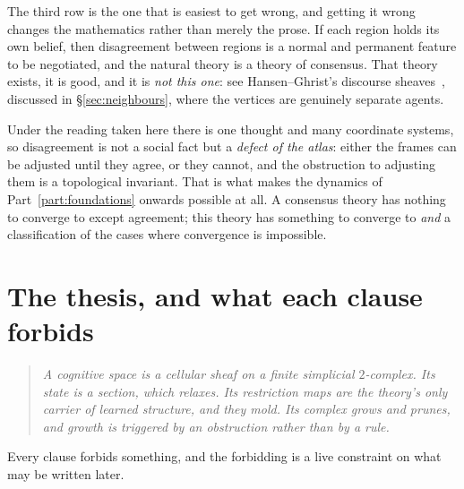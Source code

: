 \begin{hon}\Hon
The third row is the one that is easiest to get wrong, and getting it wrong
changes the mathematics rather than merely the prose. If each region holds its
own belief, then disagreement between regions is a normal and permanent
feature to be negotiated, and the natural theory is a theory of consensus.
That theory exists, it is good, and it is \emph{not this one}: see
Hansen--Ghrist's discourse sheaves~\cite{HansenGhristOpinion}, discussed in
\S\ref{sec:neighbours}, where the vertices are genuinely separate agents.

Under the reading taken here there is one thought and many coordinate systems,
so disagreement is not a social fact but a \emph{defect of the atlas}: either
the frames can be adjusted until they agree, or they cannot, and the
obstruction to adjusting them is a topological invariant. That is what makes
the dynamics of Part~\ref{part:foundations} onwards possible at all. A
consensus theory has nothing to converge to except agreement; this theory has
something to converge to \emph{and} a classification of the cases where
convergence is impossible.
\end{hon}

\section{The thesis, and what each clause forbids}

\begin{quote}\itshape
A cognitive space is a cellular sheaf on a finite simplicial $2$-complex.
Its state is a section, which relaxes. Its restriction maps are the theory's
only carrier of learned structure, and they mold. Its complex grows and
prunes, and growth is triggered by an obstruction rather than by a rule.
\end{quote}

Every clause forbids something, and the forbidding is a live constraint on
what may be written later.

